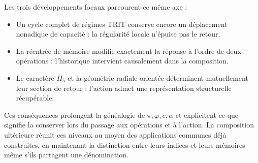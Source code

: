 Les trois développements focaux parcourent ce même axe :
\begin{itemize}
 \item Un cycle complet de régimes TRIT conserve encore un
 déplacement nonadique de capacité : la régularité locale n’épuise pas
 le retour.
 \item La réentrée de mémoire modifie exactement la réponse à l’ordre
 de deux opérations : l’historique intervient causalement dans la composition.
 \item Le caractère $H_5$ et la géométrie radiale orientée déterminent
 mutuellement leur section de retour : l’action admet une représentation
 structurelle récupérable.
\end{itemize}
Ces conséquences prolongent la généalogie de $\pi,\varphi,e,\alpha$ et
explicitent ce que signifie la conserver lors du passage aux opérations et à
l’action. La composition ultérieure réunit ces niveaux au moyen des applications
communes déjà construites, en maintenant la distinction entre leurs indices et
leurs mémoires même s’ils partagent une dénomination.
